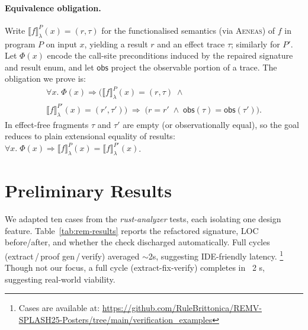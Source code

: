 \documentclass[format=sigplan,screen,10pt]{acmart}
\begin{document}

\vspace{-0.5\baselineskip}
\paragraph*{Equivalence obligation.}
Write $\llbracket f \rrbracket_{\lambda}^{P}(x)=(r,\tau)$ for the functionalised semantics (via \textsc{Aeneas}) of $f$ in program $P$ on input $x$, yielding a result $r$ and an effect trace $\tau$; similarly for $P'$. Let $\Phi(x)$ encode the call-site preconditions induced by the repaired signature and result enum, and let $\mathsf{obs}$ project the observable portion of a trace. The obligation we prove is:
\begin{multline}
\forall x.\;\Phi(x) \Rightarrow
\Big( \llbracket f \rrbracket_{\lambda}^{P}(x) = (r,\tau) \;\wedge \\
      \llbracket f \rrbracket_{\lambda}^{P'}(x) = (r',\tau') \Big)
\;\Rightarrow\;
\big( r = r' \;\wedge\; \mathsf{obs}(\tau) = \mathsf{obs}(\tau') \big).
\end{multline}
In effect-free fragments $\tau$ and $\tau'$ are empty (or observationally equal), so the goal reduces to plain extensional equality of results: $\forall x.\;\Phi(x) \Rightarrow \llbracket f \rrbracket_{\lambda}^{P}(x) = \llbracket f \rrbracket_{\lambda}^{P'}(x)$.

\vspace{-0.5\baselineskip}
\section{Preliminary Results}
We adapted ten cases from the \emph{rust-analyzer} tests, each isolating one design feature. Table~\ref{tab:rem-results} reports the refactored signature, LOC before/after, and whether the check discharged automatically. Full cycles (extract\,/\,proof gen\,/\,verify) averaged \(\sim\)2s, suggesting IDE-friendly latency. \footnote{Cases are available at: \url{https://github.com/RuleBrittonica/REMV-SPLASH25-Posters/tree/main/verification_examples}} 
Though not our focus, a full cycle (extract-fix-verify) completes in ~2 s, suggesting real-world viability.
\end{document}
